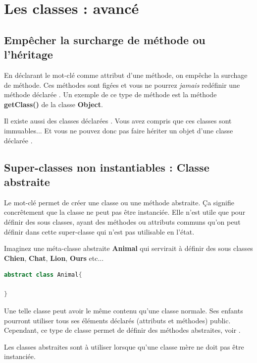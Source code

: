 \documentclass[a4paper,twoside]{article}
\begin{document}
\section{Les classes : avancé}
\subsection{Empêcher la surcharge de méthode ou l'héritage}\label{sec:empecher_heritage}
En déclarant le mot-clé  comme attribut d'une méthode, on empêche la surchage de méthode. Ces méthodes sont figées et vous ne pourrez \textit{jamais} redéfinir une méthode déclarée . Un exemple de ce type de méthode est la méthode \textbf{getClass()} de la classe \textbf{Object}.

\begin{remarque}
Il existe aussi des classes déclarées . Vous avez compris que ces classes sont immuables... Et vous ne pouvez donc pas faire hériter un objet d'une classe déclarée .
\end{remarque}

\subsection{Super-classes non instantiables : Classe abstraite}\label{sec:classe_abstraite}
Le mot-clé  permet de créer une classe ou une méthode abstraite. Ça signifie concrêtement que la classe ne peut pas être instanciée. Elle n'est utile que pour définir des sous classes, ayant des méthodes ou attributs communs qu'on peut définir dans cette super-classe qui n'est pas utilisable en l'état.
\begin{exemple}
Imaginez une méta-classe abstraite \textbf{Animal} qui servirait à définir des sous classes \textbf{Chien}, \textbf{Chat}, \textbf{Lion}, \textbf{Ours} etc...
\end{exemple}

\begin{lstlisting}[language=java]
abstract class Animal{
 
}
\end{lstlisting}

Une telle classe peut avoir le même contenu qu'une classe normale. Ses enfants pourront utiliser tous ses éléments déclarés (attributs et méthodes) public. Cependant, ce type de classe permet de définir des méthodes abstraites, voir .

\begin{remarque}
Les classes abstraites sont à utiliser lorsque qu'une classe mère ne doit pas être instanciée.
\end{remarque}
\end{document}
